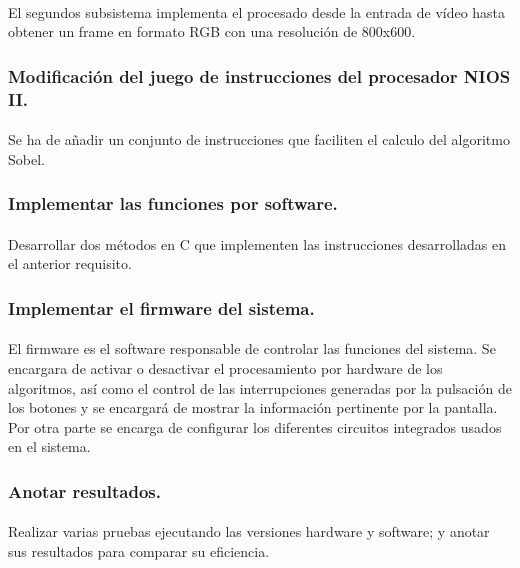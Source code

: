 \documentclass[a4paper,12pt,titlepage,final]{book}
\begin{document}
\paragraph{}
El segundos subsistema implementa el procesado desde la entrada de vídeo hasta obtener un frame en formato RGB con una resolución de 800x600.

\subsubsection{Modificación del juego de instrucciones del procesador NIOS II.}
\paragraph{}
Se ha de añadir un conjunto de instrucciones que faciliten el calculo del algoritmo Sobel.

\subsubsection{Implementar las funciones por software.}
\paragraph{}
Desarrollar dos métodos en C que implementen las instrucciones desarrolladas en el anterior requisito.

\subsubsection{Implementar el firmware del sistema.}
\paragraph{}
El firmware es el software responsable de controlar las funciones del sistema. Se encargara de activar o desactivar el procesamiento por hardware de los algoritmos, así como el control de las interrupciones generadas por la pulsación de los botones y se encargará de mostrar la información pertinente por la pantalla. Por otra parte se encarga de configurar los diferentes circuitos integrados usados en el sistema.

\subsubsection{Anotar resultados.}
\paragraph{}
Realizar varias pruebas ejecutando las versiones hardware y software; y anotar sus resultados para comparar su eficiencia.
\end{document}
